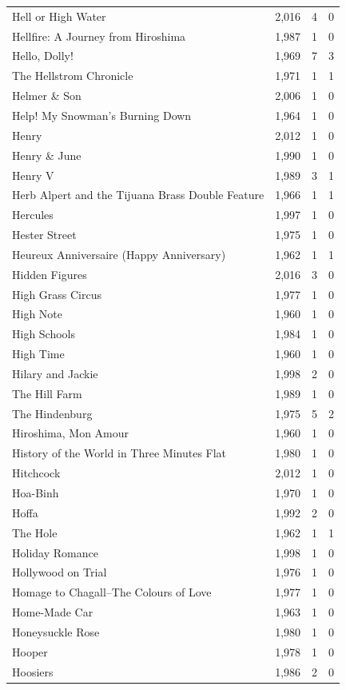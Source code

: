 \begin{tabular}{lrrr}
Hell or High Water & 2,016 & 4 & 0 \\
Hellfire: A Journey from Hiroshima & 1,987 & 1 & 0 \\
Hello, Dolly! & 1,969 & 7 & 3 \\
The Hellstrom Chronicle & 1,971 & 1 & 1 \\
Helmer \& Son & 2,006 & 1 & 0 \\
Help! My Snowman's Burning Down & 1,964 & 1 & 0 \\
Henry & 2,012 & 1 & 0 \\
Henry \& June & 1,990 & 1 & 0 \\
Henry V & 1,989 & 3 & 1 \\
Herb Alpert and the Tijuana Brass Double Feature & 1,966 & 1 & 1 \\
Hercules & 1,997 & 1 & 0 \\
Hester Street & 1,975 & 1 & 0 \\
Heureux Anniversaire (Happy Anniversary) & 1,962 & 1 & 1 \\
Hidden Figures & 2,016 & 3 & 0 \\
High Grass Circus & 1,977 & 1 & 0 \\
High Note & 1,960 & 1 & 0 \\
High Schools & 1,984 & 1 & 0 \\
High Time & 1,960 & 1 & 0 \\
Hilary and Jackie & 1,998 & 2 & 0 \\
The Hill Farm & 1,989 & 1 & 0 \\
The Hindenburg & 1,975 & 5 & 2 \\
Hiroshima, Mon Amour & 1,960 & 1 & 0 \\
History of the World in Three Minutes Flat & 1,980 & 1 & 0 \\
Hitchcock & 2,012 & 1 & 0 \\
Hoa-Binh & 1,970 & 1 & 0 \\
Hoffa & 1,992 & 2 & 0 \\
The Hole & 1,962 & 1 & 1 \\
Holiday Romance & 1,998 & 1 & 0 \\
Hollywood on Trial & 1,976 & 1 & 0 \\
Homage to Chagall--The Colours of Love & 1,977 & 1 & 0 \\
Home-Made Car & 1,963 & 1 & 0 \\
Honeysuckle Rose & 1,980 & 1 & 0 \\
Hooper & 1,978 & 1 & 0 \\
Hoosiers & 1,986 & 2 & 0 \\

\end{tabular}
